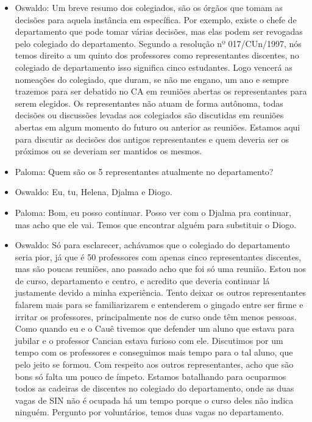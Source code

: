 \documentclass{ata-calico}
\begin{document}
\begin{itemize}
\item Oswaldo: Um breve resumo dos colegiados, são os órgãos que tomam as decisões para aquela instância em específica. Por exemplo, existe o chefe de departamento que pode tomar várias decisões, mas elas podem ser revogadas pelo colegiado do departamento. Segundo a resolução nº 017/CUn/1997, nós temos direito a um quinto dos professores como representantes discentes, no colegiado de departamento isso significa cinco estudantes. Logo vencerá as nomeações do colegiado, que duram, se não me engano, um ano e sempre trazemos para ser debatido no CA em reuniões abertas os representantes para serem elegidos. Os representantes não atuam de forma autônoma, todas decisões ou discussões levadas aos colegiados são discutidas em reuniões abertas em algum momento do futuro ou anterior as reuniões. Estamos aqui para discutir as decisões dos antigos representantes e quem deveria ser os próximos ou se deveriam ser mantidos os mesmos.

\item Paloma: Quem são os 5 representantes atualmente no departamento?

\item Oswaldo: Eu, tu, Helena, Djalma e Diogo.

\item Paloma: Bom, eu posso continuar. Posso ver com o Djalma pra continuar, mas acho que ele vai. Temos que encontrar alguém para substituir o Diogo.

\item Oswaldo: Só para esclarecer, achávamos que o colegiado do departamento seria pior, já que é 50 professores com apenas cinco representantes discentes, mas são poucas reuniões, ano passado acho que foi só uma reunião. Estou nos de curso, departamento e centro, e acredito que deveria continuar lá justamente devido a minha experiência. Tento deixar os outros representantes falarem mais para se familiarizarem e entenderem o gingado entre ser firme e irritar os professores, principalmente nos de curso onde têm menos pessoas. Como quando eu e o Cauê tivemos que defender um aluno que estava para jubilar e o professor Cancian estava furioso com ele. Discutimos por um tempo com os professores e conseguimos mais tempo para o tal aluno, que pelo jeito se formou. Com respeito aos outros representantes, acho que são bons só falta um pouco de ímpeto. Estamos batalhando para ocuparmos todos as cadeiras de discentes no colegiado do departamento, onde as duas vagas de SIN não é ocupada há um tempo porque o curso deles não indica ninguém. Pergunto por voluntários, temos duas vagas no departamento.


\end{itemize}
\end{document}

